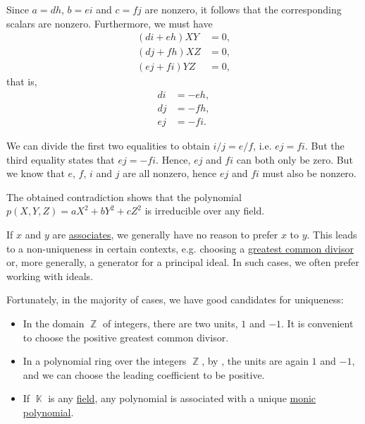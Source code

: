 \begin{example}
\begin{thmenum}
    Since \( a = dh \), \( b = ei \) and \( c = fj \) are nonzero, it follows that the corresponding scalars are nonzero. Furthermore, we must have
    \begin{align*}
      (d i + e h) X Y &= 0, \\
      (d j + f h) X Z &= 0, \\
      (e j + f i) Y Z &= 0,
    \end{align*}
    that is,
    \begin{align*}
      d i &= - e h, \\
      d j &= - f h, \\
      e j &= - f i.
    \end{align*}

    We can divide the first two equalities to obtain \( i / j = e / f \), i.e. \( ej = fi \). But the third equality states that \( ej = -fi \). Hence, \( ej \) and \( fi \) can both only be zero. But we know that \( e \), \( f \), \( i \) and \( j \) are all nonzero, hence \( ej \) and \( fi \) must also be nonzero.

    The obtained contradiction shows that the polynomial \( p(X, Y, Z) = a X^2 + b Y^2 + c Z^2 \) is irreducible over any field.
  \end{thmenum}
\end{example}

\begin{remark}\label{rem:choice_of_associates}
  If \( x \) and \( y \) are \hyperref[def:domain_divisibility/associates]{associates}, we generally have no reason to prefer \( x \) to \( y \). This leads to a non-uniqueness in certain contexts, e.g. choosing a \hyperref[def:gcd]{greatest common divisor} or, more generally, a generator for a principal ideal. In such cases, we often prefer working with ideals.

  Fortunately, in the majority of cases, we have good candidates for uniqueness:
  \begin{itemize}
    \item In the domain \( \BbbZ \) of integers, there are two units, \( 1 \) and \( -1 \). It is convenient to choose the positive greatest common divisor.

    \item In a polynomial ring over the integers \( \BbbZ \), by , the units are again \( 1 \) and \( -1 \), and we can choose the leading coefficient to be positive.

    \item If \( \BbbK \) is any \hyperref[def:field]{field}, any polynomial is associated with a unique \hyperref[def:monic_polynomial]{monic polynomial}.
  \end{itemize}
\end{remark}

